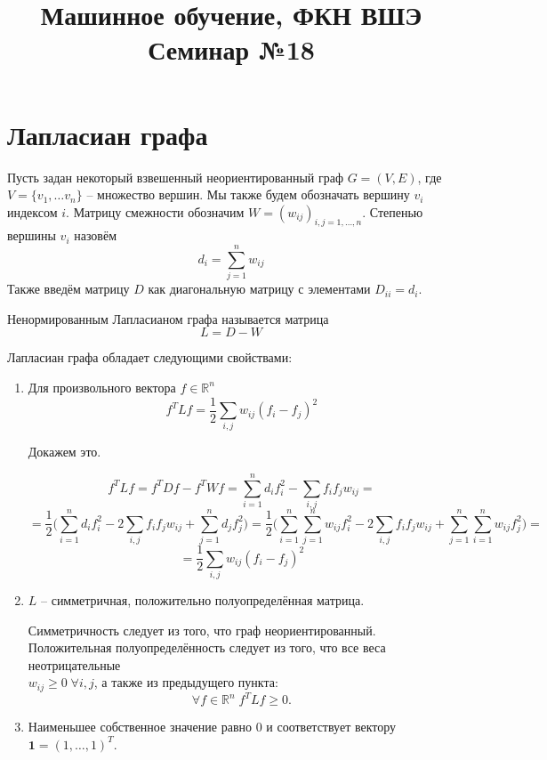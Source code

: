 \documentclass[12pt,a4paper]{article}
\title{Машинное обучение, ФКН ВШЭ\\Семинар №18}
\author{}
\date{}
\begin{document}
\maketitle

\section{Лапласиан графа}

Пусть задан некоторый взвешенный неориентированный граф $G = (V,E)$, где $V = \{v_1, \ldots v_n\}$ – множество вершин. Мы также будем обозначать вершину $v_i$ индексом $i$. Матрицу смежности обозначим $W = (w_{ij})_{i,j=1,\ldots,n}$. Степенью вершины $v_i$ назовём
\begin{equation*}
	d_{i} = \sum_{j=1}^nw_{ij}
\end{equation*}
Также введём матрицу $D$ как диагональную матрицу с элементами $D_{ii} = d_i$.

Ненормированным Лапласианом графа называется матрица
\begin{equation*}
	L = D - W
\end{equation*}

Лапласиан графа обладает следующими свойствами:
\begin{enumerate}
	\item Для произвольного вектора $f \in \mathbb{R}^n$
		\begin{equation*}
			f^T L f = \frac{1}{2} \sum_{i,j}w_{ij}(f_i -f _j)^2
		\end{equation*}
		
		Докажем это.
		
		\begin{equation*}
			f^T L f = f^T D f - f^T W f = \sum_{i=1}^n d_i f_i^2 - \sum_{i,j} f_i f_j w_{ij} =
		\end{equation*}
		\begin{equation*}
			= \frac{1}{2} \bigg( \sum_{i=1}^n d_i f_i^2 - 2\sum_{i,j} f_i f_j w_{ij} + \sum_{j=1}^n d_j f_j^2 \bigg) =
			\frac{1}{2} \bigg( \sum_{i=1}^n \sum_{j=1}^n w_{ij} f_i^2 - 2\sum_{i,j} f_i f_j w_{ij} + \sum_{j=1}^n \sum_{i=1}^n w_{ij} f_j^2 \bigg) = 
		\end{equation*}
		\begin{equation*}
			= \frac{1}{2} \sum_{i,j}w_{ij}(f_i -f _j)^2
		\end{equation*}
	\item $L$ – симметричная, положительно полуопределённая матрица.
	
		Симметричность следует из того, что граф неориентированный. Положительная полуопределённость следует из того, что все веса неотрицательные\\ 
		$w_{ij} \geq 0 \; \forall i,j$, а также из предыдущего пункта:
		\begin{equation*}
			\forall f \in \mathbb{R}^n \; f^T L f \geq 0.
		\end{equation*}
	\item Наименьшее собственное значение равно $0$ и соответствует вектору $\mathbf{1} = (1,\ldots,1)^T$.
\end{enumerate}
\end{document}

